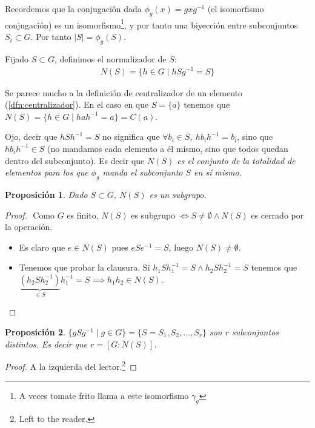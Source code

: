 \documentclass{book}
\newtheorem{pro}{Proposición}
\theoremstyle{definition}
\theoremstyle{remark}
\newcommand{\inv}[1]{#1^{-1}}
\begin{document}
Recordemos que la conjugación dada $\phi_g(x) = gx\inv{g}$ (el isomorfismo conjugación) es un isomorfismo\footnote{A veces tomate frito llama a este isomorfismo $\gamma_g$}, y por tanto una biyección entre subconjuntos $S_i \subset G$. Por tanto $|S| = \phi_g(S)$.

\begin{dfn}
	\label{dfn:normalizador}
	Fijado $S \subset G$, definimos el normalizador de $S$:
	\begin{align}
		N(S) = \{h \in G \mid hS\inv{g} = S\}
	\end{align} 
\end{dfn}

Se parece mucho a la definición de centralizador de un elemento (\ref{dfn:centralizador}). En el caso en que $S = \{a\}$ tenemos que $N(S) = \{h \in G \mid ha\inv{h} = a\} = C(a)$.

Ojo, decir que $hS\inv{h} = S$ no significa que $\forall b_i \in S,\ hb_i\inv{h} = b_i$, sino que $hb_i\inv{h} \in S$ (no mandamos cada elemento a él mismo, sino que todos quedan dentro del subconjunto). Es decir que \textit{$N(S)$ es el conjunto de la totalidad de elementos para los que $\phi_g$ manda el subconjunto $S$ en sí mismo.}

\begin{pro}
	Dado $S \subset G,\ N(S)$ es un subgrupo.
\end{pro}

\begin{proof}$ $\newline
	Como $G$ es finito, $N(S)$ es subgrupo $\iff S \neq \emptyset \land N(S)$ es cerrado por la operación.
	\begin{itemize}
		\item Es claro que $e \in N(S)$ pues $eS\inv{e} = S$, luego $N(S) \neq \emptyset$.
		\item Tenemos que probar la clausura. Si $h_1S\inv{h_1} = S \land h_2S\inv{h_2} = S$ tenemos que $\underbrace{(h_2S\inv{h_2})}_{\in S}\inv{h_1} = S \implies h_1h_2 \in N(S)$.
	\end{itemize}
\end{proof}

\begin{pro}
	\label{pro:propiedad2Ns}
 	$\{gS\inv{g} \mid g \in G\} = \{S = S_1, S_2, \dots, S_r\}$ son $r$ subconjuntos distintos. Es decir que $r = [G: N(S)]$.
\end{pro}

\begin{proof}
	A la izquierda del lector.\footnote{Left to the reader.}
\end{proof}
\end{document}
